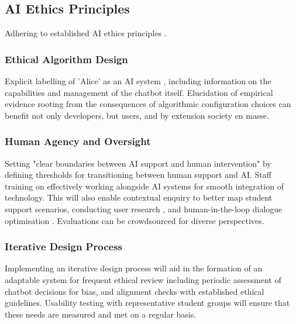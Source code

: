 \documentclass[14pt,a4paper]{article}
\begin{document}
\begin{multicols}{2}
\subsection{AI Ethics Principles}
Adhering to established AI ethics principles \textit{\parencite{EC2024}}.


\subsubsection{Ethical Algorithm Design}
Explicit labelling of 'Alice' as an AI system \textit{\parencite{IEEE2023}}, including information on the capabilities and management of the chatbot itself. Elucidation of empirical evidence rooting from the consequences of algorithmic configuration choices can benefit not only developers, but users, and by extension society en masse.

\subsubsection{Human Agency and Oversight}

Setting "clear boundaries between AI support and human intervention" \textit{\parencite{APA2024}}by defining thresholds for transitioning between human support and AI. Staff training on effectively working alongside AI systems for smooth integration of technology. This will also enable contextual enquiry to better map student support scenarios, conducting user research \textit{\parencite[pp. 50-100]{Goodman2023}}, and human-in-the-loop dialogue optimisation \textit{\parencite[pp. 30-60]{Vaughan2024}}. Evaluations can be crowdsourced for diverse perspectives.

\subsubsection{Iterative Design Process}
Implementing an iterative design process \textit{\parencite[pp. 30-60]{HoltzblattBeyer2024}} will aid in the formation of an adaptable system for frequent ethical review \textit{\parencite{FloridiCowls2023}} including periodic assessment of chatbot decisions for bias, and alignment checks with established ethical guidelines. Usability testing with representative student groups will ensure that these needs are measured and met on a regular basis.


\end{multicols}
\end{document}
